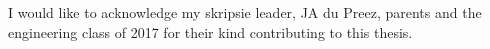 

\begin{acknowledgements}      %


I would like to acknowledge my skripsie leader, JA du Preez, parents and the engineering class of 2017 for their kind contributing to this thesis.
\end{acknowledgements}


